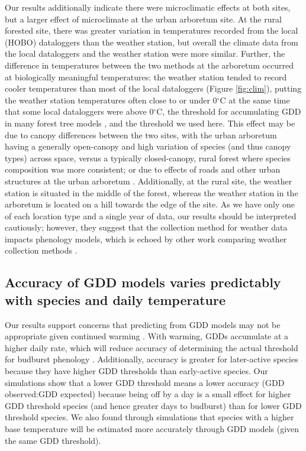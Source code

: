 \documentclass{article}\usepackage[]{graphicx}\usepackage[]{color}
\begin{document}
Our results additionally indicate there were microclimatic effects at both sites, but a larger effect of microclimate at the urban arboretum site. At the rural forested site, there was greater variation in temperatures recorded from the local (HOBO) dataloggers than the weather station, but overall the climate data from the local dataloggers and the weather station were more similar. Further, the difference in temperatures between the two methods at the arboretum occurred at biologically meaningful temperatures: the weather station tended to record cooler temperatures than most of the local dataloggers (Figure \ref{fig:clim}), putting the weather station temperatures often close to or under 0$^{\circ}$C at the same time that some local dataloggers were above 0$^{\circ}$C, the threshold for accumulating GDD in many forest tree models \citep{Man2010}, and the threshold we used here. This effect may be due to canopy differences between the two sites, with the urban arboretum having a generally open-canopy and high variation of species (and thus canopy types) across space, versus a typically closed-canopy, rural forest where species composition was more consistent; or due to effects of roads and other urban structures at the urban arboretum \citep{Stabler2005,Erell2012,Dimoudi2013}. Additionally, at the rural site, the weather station is situated in the middle of the forest, whereas the weather station in the arboretum is located on a hill towards the edge of the site. As we have only one of each location type and a single year of data, our results should be interpreted cautiously; however, they suggest that the collection method for weather data impacts phenology models, which is echoed by other work comparing weather collection methods \citep[e.g.,][]{Laigle2021}.

\subsection{Accuracy of GDD models varies predictably with species and daily temperature} 
Our results support concerns that predicting from GDD models may not be appropriate given continued warming \citep{Man2010}. With warming, GDDs accumulate at a higher daily rate, which will reduce accuracy of determining the actual threshold for budburst phenology \citep{Bonhomme2000}. Additionally, accuracy is greater for later-active species because they have higher GDD thresholds than early-active species. Our simulations show that a lower GDD threshold means a lower accuracy (GDD observed:GDD expected) because being off by a day is a small effect for higher GDD threshold species (and hence greater days to budburst) than for lower GDD threshold species. We also found through simulations that species with a higher base temperature will be estimated more accurately through GDD models (given the same GDD threshold). 
\end{document}
